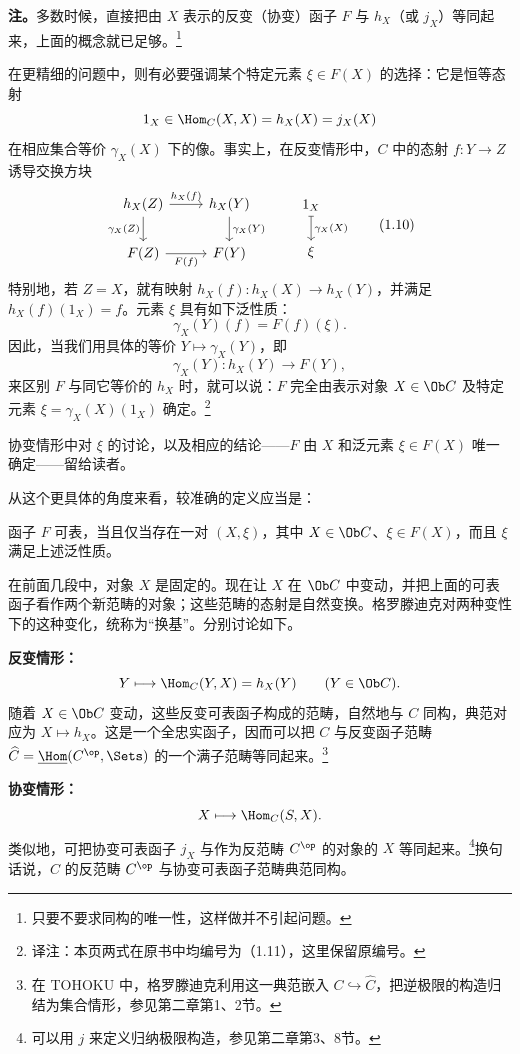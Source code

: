 \textbf{注。}多数时候，直接把由 $X$ 表示的反变（协变）函子 $F$ 与 $h_X$（或 $j_X$）等同起来，上面的概念就已足够。\footnote{只要不要求同构的唯一性，这样做并不引起问题。}

在更精细的问题中，则有必要强调某个特定元素 $\xi\in F(X)$ 的选择：它是恒等态射
\[
1_X\in\Hom_C(X,X)=h_X(X)=j_X(X)
\]
在相应集合等价 $\gamma_X(X)$ 下的像。事实上，在反变情形中，$C$ 中的态射 $f:Y\to Z$ 诱导交换方块
\[
\begin{tikzcd}[ampersand replacement=\&]
h_X(Z)\arrow[r,"h_X(f)"]\arrow[d,"\gamma_X(Z)"']\&h_X(Y)\arrow[d,"\gamma_X(Y)"]\\
F(Z)\arrow[r,"F(f)"']\&F(Y)
\end{tikzcd}
\qquad
\begin{tikzcd}[ampersand replacement=\&]
1_X\arrow[d,mapsto,"\gamma_X(X)"]\\
\xi
\end{tikzcd}\tag{1.10}
\]
特别地，若 $Z=X$，就有映射 $h_X(f):h_X(X)\to h_X(Y)$，并满足 $h_X(f)(1_X)=f$。元素 $\xi$ 具有如下泛性质：
\[
\gamma_X(Y)(f)=F(f)(\xi).\tag{1.11}
\]
因此，当我们用具体的等价 $Y\mapsto\gamma_X(Y)$，即
\[
\gamma_X(Y):h_X(Y)\longrightarrow F(Y),\tag{1.11}
\]
来区别 $F$ 与同它等价的 $h_X$ 时，就可以说：$F$ 完全由表示对象 $X\in\Ob C$ 及特定元素 $\xi=\gamma_X(X)(1_X)$ 确定。\footnote{译注：本页两式在原书中均编号为（1.11），这里保留原编号。}

协变情形中对 $\xi$ 的讨论，以及相应的结论——$F$ 由 $X$ 和泛元素 $\xi\in F(X)$ 唯一确定——留给读者。

从这个更具体的角度来看，较准确的定义应当是：

函子 $F$ 可表，当且仅当存在一对 $(X,\xi)$，其中 $X\in\Ob C$、$\xi\in F(X)$，而且 $\xi$ 满足上述泛性质。

在前面几段中，对象 $X$ 是固定的。现在让 $X$ 在 $\Ob C$ 中变动，并把上面的可表函子看作两个新范畴的对象；这些范畴的态射是自然变换。格罗滕迪克对两种变性下的这种变化，统称为“换基”。分别讨论如下。

\textbf{反变情形：}
\[
Y\longmapsto\Hom_C(Y,X)=h_X(Y)\qquad(Y\in\Ob C).
\]
随着 $X\in\Ob C$ 变动，这些反变可表函子构成的范畴，自然地与 $C$ 同构，典范对应为 $X\mapsto h_X$。这是一个全忠实函子，因而可以把 $C$ 与反变函子范畴 $\widehat C=\underline{\Hom}(C^{\op},\Sets)$ 的一个满子范畴等同起来。\footnote{在 TOHOKU 中，格罗滕迪克利用这一典范嵌入 $C\hookrightarrow\widehat C$，把逆极限的构造归结为集合情形，参见第二章第1、2节。}

\textbf{协变情形：}
\[
X\longmapsto\Hom_C(S,X).
\]
类似地，可把协变可表函子 $j_X$ 与作为反范畴 $C^{\op}$ 的对象的 $X$ 等同起来。\footnote{可以用 $j$ 来定义归纳极限构造，参见第二章第3、8节。}换句话说，$C$ 的反范畴 $C^{\op}$ 与协变可表函子范畴典范同构。

